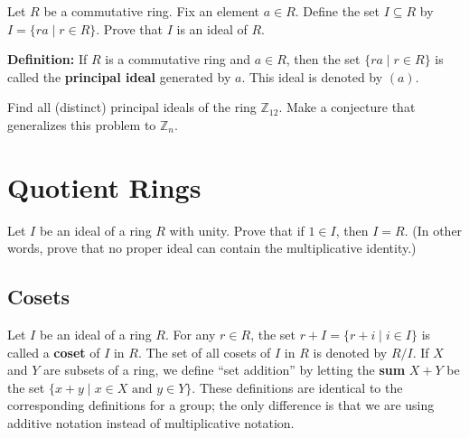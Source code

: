 \begin{problem}
Let \(R\) be a commutative ring. Fix an element \(a \in R\). Define the set \(I \subseteq R\) by \(I = \{ ra \mid r\in R\}\). Prove that \(I\) is an ideal of \(R\).
\end{problem}

\textbf{Definition:} If \(R\) is a commutative ring and \(a\in R\), then the set \(\{ra \mid r\in R\}\) is called the \textbf{principal ideal} generated by \(a\). This ideal is denoted by \((a)\).

\begin{problem}
Find all (distinct) principal ideals of the ring \(\mathbb{Z}_{12}\). Make a conjecture that generalizes this problem to \(\mathbb{Z}_n\).
\end{problem}

\chapter{Quotient Rings}\label{chap:quotientrings}

\begin{problem}
Let \(I\) be an ideal of a ring \(R\) with unity. Prove that if \(1\in I\), then \(I=R\). (In other words, prove that no proper ideal can contain the multiplicative identity.)
\end{problem}

\section{Cosets}

Let \(I\) be an ideal of a ring \(R\). For any \(r\in R\), the set \(r+I = \{r+i \mid i \in I\}\) is called a \textbf{coset} of \(I\) in \(R\). The set of all cosets of \(I\) in \(R\) is denoted by \(R/I\). If \(X\) and \(Y\) are subsets of a ring, we define ``set addition'' by letting the \textbf{sum} \(X+Y\) be the set \(\{x+y \mid x\in X \mbox{ and } y\in Y\}\).
These definitions are identical to the corresponding definitions for a group; the only difference is that we are using additive notation instead of multiplicative notation.

